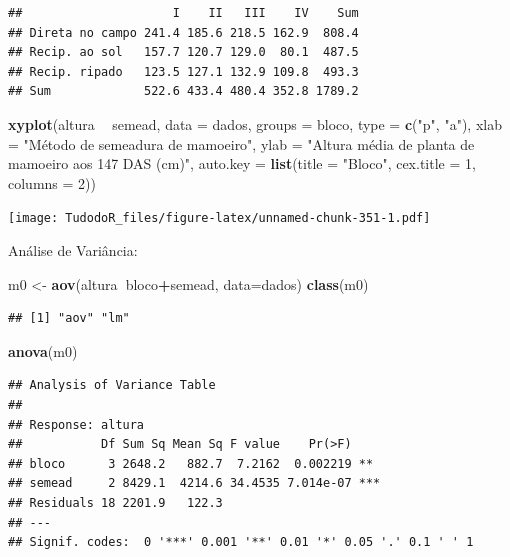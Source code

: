 \documentclass[
]{book}
\newenvironment{Shaded}{\begin{snugshade}}{\end{snugshade}}
\newcommand{\DataTypeTok}[1]{\textcolor[rgb]{0.13,0.29,0.53}{#1}}
\newcommand{\DecValTok}[1]{\textcolor[rgb]{0.00,0.00,0.81}{#1}}
\newcommand{\KeywordTok}[1]{\textcolor[rgb]{0.13,0.29,0.53}{\textbf{#1}}}
\newcommand{\NormalTok}[1]{#1}
\newcommand{\OperatorTok}[1]{\textcolor[rgb]{0.81,0.36,0.00}{\textbf{#1}}}
\newcommand{\StringTok}[1]{\textcolor[rgb]{0.31,0.60,0.02}{#1}}
\begin{document}
\begin{verbatim}
##                     I    II   III    IV    Sum
## Direta no campo 241.4 185.6 218.5 162.9  808.4
## Recip. ao sol   157.7 120.7 129.0  80.1  487.5
## Recip. ripado   123.5 127.1 132.9 109.8  493.3
## Sum             522.6 433.4 480.4 352.8 1789.2
\end{verbatim}

\begin{Shaded}
\begin{Highlighting}[]
\KeywordTok{xyplot}\NormalTok{(altura }\OperatorTok{~}\StringTok{ }\NormalTok{semead, }\DataTypeTok{data =}\NormalTok{ dados,}
  \DataTypeTok{groups =}\NormalTok{ bloco, }\DataTypeTok{type =} \KeywordTok{c}\NormalTok{(}\StringTok{"p"}\NormalTok{, }\StringTok{"a"}\NormalTok{),}
  \DataTypeTok{xlab =} \StringTok{"Método de semeadura de mamoeiro"}\NormalTok{,}
  \DataTypeTok{ylab =} \StringTok{"Altura média de planta de mamoeiro aos 147 DAS (cm)"}\NormalTok{,}
  \DataTypeTok{auto.key =} \KeywordTok{list}\NormalTok{(}\DataTypeTok{title =} \StringTok{"Bloco"}\NormalTok{, }\DataTypeTok{cex.title =} \DecValTok{1}\NormalTok{, }\DataTypeTok{columns =} \DecValTok{2}\NormalTok{))}
\end{Highlighting}
\end{Shaded}

\texttt{[image: TudodoR\_files/figure-latex/unnamed-chunk-351-1.pdf]}

Análise de Variância:

\begin{Shaded}
\begin{Highlighting}[]
\NormalTok{m0 <-}\StringTok{ }\KeywordTok{aov}\NormalTok{(altura}\OperatorTok{~}\NormalTok{bloco}\OperatorTok{+}\NormalTok{semead, }\DataTypeTok{data=}\NormalTok{dados)}
\KeywordTok{class}\NormalTok{(m0)}
\end{Highlighting}
\end{Shaded}

\begin{verbatim}
## [1] "aov" "lm"
\end{verbatim}

\begin{Shaded}
\begin{Highlighting}[]
\KeywordTok{anova}\NormalTok{(m0)}
\end{Highlighting}
\end{Shaded}

\begin{verbatim}
## Analysis of Variance Table
## 
## Response: altura
##           Df Sum Sq Mean Sq F value    Pr(>F)    
## bloco      3 2648.2   882.7  7.2162  0.002219 ** 
## semead     2 8429.1  4214.6 34.4535 7.014e-07 ***
## Residuals 18 2201.9   122.3                      
## ---
## Signif. codes:  0 '***' 0.001 '**' 0.01 '*' 0.05 '.' 0.1 ' ' 1
\end{verbatim}
\end{document}
